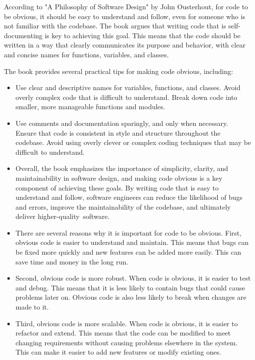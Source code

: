 { 

    
 According to "A Philosophy of Software Design" by John Ousterhout, for code to be obvious, it should be easy to understand and follow, even for someone who is not familiar with the codebase. The book argues that writing code that is self-documenting is key to achieving this goal. This means that the code should be written in a way that clearly communicates its purpose and behavior, with clear and concise names for functions, variables, and classes. \newpage
 
 The book provides several practical tips for making code obvious, including:\newline
    
   \begin{itemize}
    \item Use clear and descriptive names for variables, functions, and classes.
    Avoid overly complex code that is difficult to understand.
    Break down code into smaller, more manageable functions and modules.
   
    \item  Use comments and documentation sparingly, and only when necessary.
    Ensure that code is consistent in style and structure throughout the codebase.
    Avoid using overly clever or complex coding techniques that may be difficult to understand.  \newpage
     \item Overall, the book emphasizes the importance of simplicity, clarity, and maintainability in software design, and making code obvious is a key component of achieving these goals. By writing code that is easy to understand and follow, software engineers can reduce the likelihood of bugs and errors, improve the maintainability of the codebase, and ultimately deliver higher-quality software. \cite{Mancuso:2014}
   
  \end{itemize}

}
{ 

\begin{itemize}
	\item There are several reasons why it is important for code to be obvious. First, obvious code is easier to understand and maintain. This means that bugs can be fixed more quickly and new features can be added more easily. This can save time and money in the long run.
	
	\item Second, obvious code is more robust. When code is obvious, it is easier to test and debug. This means that it is less likely to contain bugs that could cause problems later on. Obvious code is also less likely to break when changes are made to it.
	
	\item Third, obvious code is more scalable. When code is obvious, it is easier to refactor and extend. This means that the code can be modified to meet changing requirements without causing problems elsewhere in the system. This can make it easier to add new features or modify existing ones.
	
\end{itemize}
}
